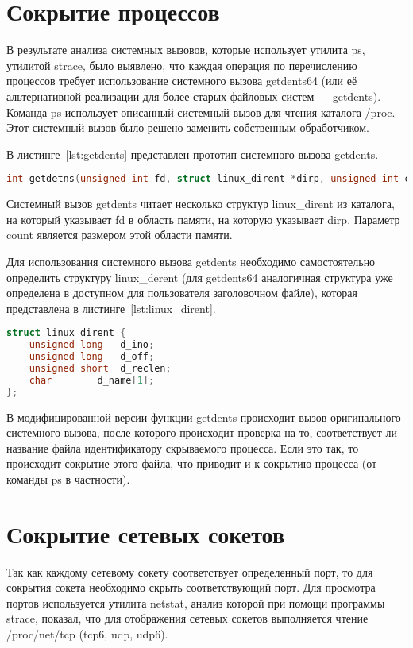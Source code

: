 \section{Сокрытие процессов}%
\label{sec:skrytie_protsessov}
В результате анализа системных вызовов, которые использует утилита
ps, утилитой strace, было выявлено, что каждая операция по
перечислению процессов требует использование системного вызова getdents64
(или её альтернативной реализации для более старых файловых систем —
getdents). Команда ps использует описанный системный вызов для чтения
каталога /proc. Этот системный вызов было решено заменить собственным
обработчиком.

В листинге~\ref{lst:getdents} представлен прототип системного вызова getdents.
\begin{lstlisting}[language=c,caption={Прототип системного вызова getdents},label=lst:getdents]
int getdetns(unsigned int fd, struct linux_dirent *dirp, unsigned int count);    
\end{lstlisting}

Системный вызов getdents читает несколько структур linux\_dirent из каталога, на который указывает fd в область памяти, на которую указывает dirp. Параметр count является размером этой области памяти.

Для использования системного вызова getdents необходимо самостоятельно определить структуру linux\_derent (для getdents64 аналогичная структура уже определена в доступном для пользователя заголовочном файле), которая представлена в листинге~\ref{lst:linux_dirent}.
\begin{lstlisting}[language=c,caption={Структура linux\_dirent},label=lst:linux_dirent]
struct linux_dirent {
    unsigned long	d_ino;
    unsigned long	d_off;
    unsigned short	d_reclen;
    char		d_name[1];
};
\end{lstlisting}

В модифицированной версии функции getdents происходит вызов оригинального системного вызова, после которого происходит проверка на то, соответствует ли название файла идентификатору скрываемого процесса. Если это так, то происходит сокрытие этого файла, что приводит и к сокрытию процесса (от команды ps в частности).


\section{Сокрытие сетевых сокетов}%
\label{sec:skrytie_setevykh_soketov}

Так как каждому сетевому сокету соответствует определенный порт, то
для сокрытия сокета необходимо скрыть соответствующий порт. Для просмотра
портов используется утилита netstat, анализ которой при помощи программы
strace, показал, что для отображения сетевых сокетов выполняется чтение
/proc/net/tcp (tcp6, udp, udp6).

